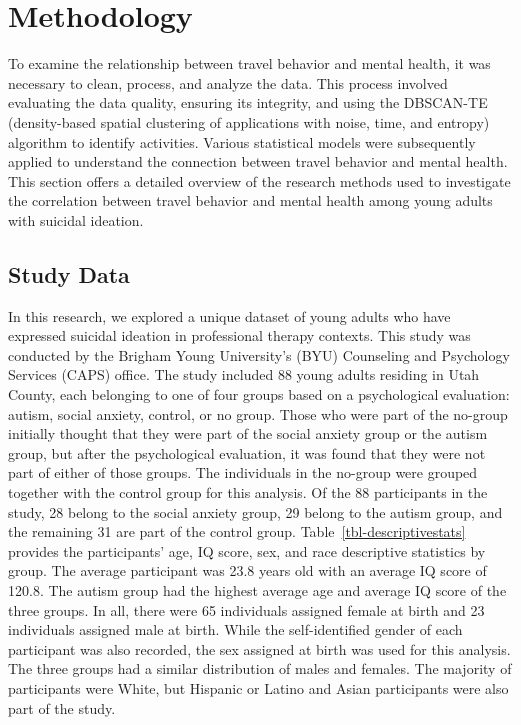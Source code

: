 \documentclass[
  letterpaper,
  number,
  review,
  3p]{elsarticle}
\begin{document}

\section{Methodology}\label{methodology}

To examine the relationship between travel behavior and mental health,
it was necessary to clean, process, and analyze the data. This process
involved evaluating the data quality, ensuring its integrity, and using
the DBSCAN-TE (density-based spatial clustering of applications with
noise, time, and entropy) algorithm to identify activities. Various
statistical models were subsequently applied to understand the
connection between travel behavior and mental health. This section
offers a detailed overview of the research methods used to investigate
the correlation between travel behavior and mental health among young
adults with suicidal ideation.

\subsection{Study Data}\label{study-data}

In this research, we explored a unique dataset of young adults who have
expressed suicidal ideation in professional therapy contexts. This study
was conducted by the Brigham Young University's (BYU) Counseling and
Psychology Services (CAPS) office. The study included 88 young adults
residing in Utah County, each belonging to one of four groups based on a
psychological evaluation: autism, social anxiety, control, or no group.
Those who were part of the no-group initially thought that they were
part of the social anxiety group or the autism group, but after the
psychological evaluation, it was found that they were not part of either
of those groups. The individuals in the no-group were grouped together
with the control group for this analysis. Of the 88 participants in the
study, 28 belong to the social anxiety group, 29 belong to the autism
group, and the remaining 31 are part of the control group.
Table~\ref{tbl-descriptivestats} provides the participants' age, IQ
score, sex, and race descriptive statistics by group. The average
participant was 23.8 years old with an average IQ score of 120.8. The
autism group had the highest average age and average IQ score of the
three groups. In all, there were 65 individuals assigned female at birth
and 23 individuals assigned male at birth. While the self-identified
gender of each participant was also recorded, the sex assigned at birth
was used for this analysis. The three groups had a similar distribution
of males and females. The majority of participants were White, but
Hispanic or Latino and Asian participants were also part of the study.
\end{document}
